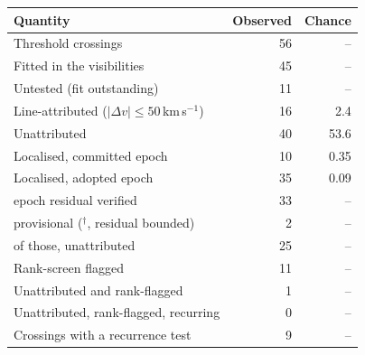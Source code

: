 \begin{tabular}{@{}lrr@{}}
\hline
Quantity & Observed & Chance \\
\hline
Threshold crossings & 56 & -- \\
Fitted in the visibilities & 45 & -- \\
Untested (fit outstanding) & 11 & -- \\
Line-attributed ($|\Delta v|\leq50$\,km\,s$^{-1}$) & 16 & 2.4 \\
Unattributed & 40 & 53.6 \\
Localised, committed epoch & 10 & 0.35 \\
Localised, adopted epoch & 35 & 0.09 \\
\quad epoch residual verified & 33 & -- \\
\quad provisional ($^{\dagger}$, residual bounded) & 2 & -- \\
\quad of those, unattributed & 25 & -- \\
Rank-screen flagged & 11 & -- \\
Unattributed and rank-flagged & 1 & -- \\
Unattributed, rank-flagged, recurring & 0 & -- \\
Crossings with a recurrence test & 9 & -- \\
\hline
\end{tabular}
